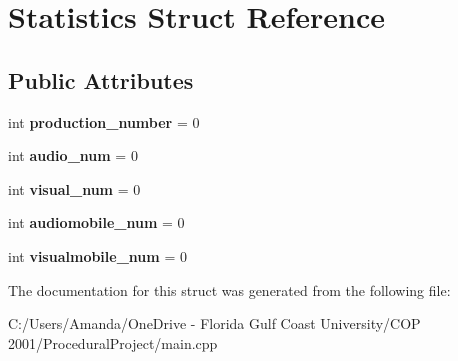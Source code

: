 \hypertarget{struct_statistics}{}\section{Statistics Struct Reference}
\label{struct_statistics}
\subsection*{Public Attributes}
\begin{DoxyCompactItemize}
\item 
\mbox{\label{struct_statistics_afb68c82dbce017486dedfa9e30954e22}} 
int {\bfseries production\+\_\+number} = 0
\item 
\mbox{\label{struct_statistics_af7b5e2ee93385134d645f546505296b4}} 
int {\bfseries audio\+\_\+num} = 0
\item 
\mbox{\label{struct_statistics_a453766cc9c0df2773dda2e8cbc41bdeb}} 
int {\bfseries visual\+\_\+num} = 0
\item 
\mbox{\label{struct_statistics_a34ae994f4d0f82fdc526c20ef2dcff2a}} 
int {\bfseries audiomobile\+\_\+num} = 0
\item 
\mbox{\label{struct_statistics_a3d1861457b8c3248b9e08386f17fd506}} 
int {\bfseries visualmobile\+\_\+num} = 0
\end{DoxyCompactItemize}


The documentation for this struct was generated from the following file\+:\begin{DoxyCompactItemize}
\item 
C\+:/\+Users/\+Amanda/\+One\+Drive -\/ Florida Gulf Coast University/\+C\+O\+P 2001/\+Procedural\+Project/main.\+cpp\end{DoxyCompactItemize}
